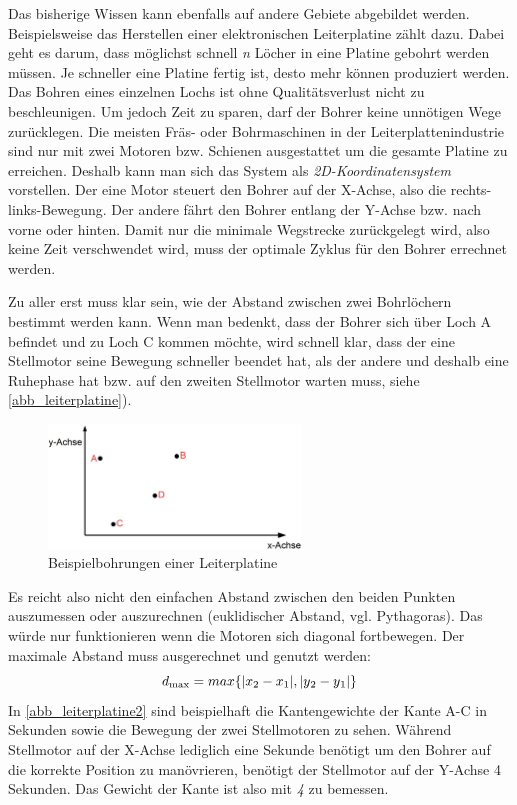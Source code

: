 \documentclass{article}
\begin{document}
Das bisherige Wissen kann ebenfalls auf andere Gebiete abgebildet werden. Beispielsweise das Herstellen einer elektronischen Leiterplatine zählt dazu. Dabei geht es darum, dass möglichst schnell \textit{n} Löcher in eine Platine gebohrt werden müssen. Je schneller eine Platine fertig ist, desto mehr können produziert werden. Das Bohren eines einzelnen Lochs ist ohne Qualitätsverlust nicht zu beschleunigen. Um jedoch Zeit zu sparen, darf der Bohrer keine unnötigen Wege zurücklegen. Die meisten Fräs- oder Bohrmaschinen in der Leiterplattenindustrie sind nur mit zwei Motoren bzw. Schienen ausgestattet um die gesamte Platine zu erreichen. Deshalb kann man sich das System als \textit{2D-Koordinatensystem} vorstellen. Der eine Motor steuert den Bohrer auf der X-Achse, also die rechts-links-Bewegung. Der andere fährt den Bohrer entlang der Y-Achse bzw. nach vorne oder hinten. Damit nur die minimale Wegstrecke zurückgelegt wird, also keine Zeit verschwendet wird, muss der optimale Zyklus für den Bohrer errechnet werden.

Zu aller erst muss klar sein, wie der Abstand zwischen zwei Bohrlöchern bestimmt werden kann. Wenn man bedenkt, dass der Bohrer sich über Loch A befindet und zu Loch C kommen möchte, wird schnell klar, dass der eine Stellmotor seine Bewegung schneller beendet hat, als der andere und deshalb eine Ruhephase hat bzw. auf den zweiten Stellmotor warten muss, siehe  \autoref{abb_leiterplatine}).

\begin{figure}[H]
	\centering
	\includegraphics[width=0.6\textwidth]{leiterplatine.jpg}
	\caption{Beispielbohrungen einer Leiterplatine}
	\label{abb_leiterplatine}
\end{figure}

Es reicht also nicht den einfachen Abstand zwischen den beiden Punkten auszumessen oder auszurechnen (euklidischer Abstand, vgl. Pythagoras). Das würde nur funktionieren wenn die Motoren sich diagonal fortbewegen. Der maximale Abstand muss ausgerechnet und genutzt werden:
\[d\textsubscript{max} = max\{ |x\textsubscript{2} - x\textsubscript{1}| , |y\textsubscript{2} - y\textsubscript{1}|\} \]
In \autoref{abb_leiterplatine2} sind beispielhaft die Kantengewichte der Kante A-C in Sekunden sowie die Bewegung der zwei Stellmotoren zu sehen. Während Stellmotor auf der X-Achse lediglich eine Sekunde benötigt um den Bohrer auf die korrekte Position zu manövrieren, benötigt der Stellmotor auf der Y-Achse 4 Sekunden. Das Gewicht der Kante ist also mit \textit{4} zu bemessen.
\end{document}
